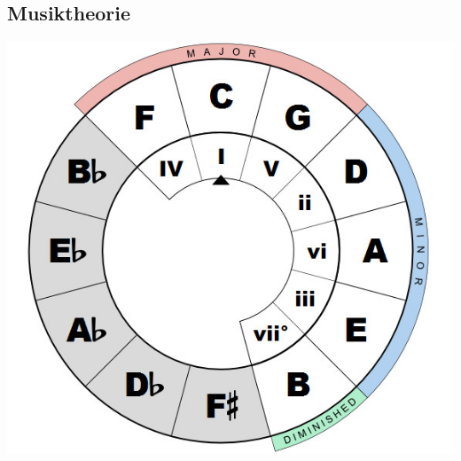 \documentclass[fs, footer]{latex4ei}
\begin{document}
\begin{multicols}{4}

















\section{Musiktheorie}

\begin{center}
\includegraphics[width=0.7\columnwidth]{./img/circle-of-fifths.jpg}
\end{center}


\end{multicols}
\end{document}
